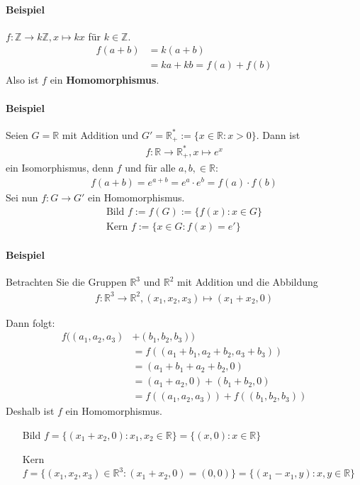 \documentclass[11pt]{report}
\newcommand*\Zb[1] {\mathbb{#1}}
\newcommand*\f[1] {\textbf{#1}}
\begin{document}
\paragraph{Beispiel} $f: \Zb{Z} \rightarrow k\Zb{Z}, x \mapsto kx$ für $k \in \Zb{Z}$.
\begin{align}
 f(a+b) &= k(a+b) \\
        &= ka + kb = f(a) + f(b)
\end{align}
Also ist $f$ ein \f{Homomorphismus}.


\paragraph{Beispiel}
Seien $G= \Zb{R}$ mit Addition und $G' = \Zb{R}^{*}_{+} := \{x \in \Zb{R}: x > 0\}$.
Dann ist 
\begin{align}
 f: \Zb{R}\rightarrow \Zb{R}_{+}^{*}, x \mapsto e^x
\end{align}
ein Isomorphismus, denn $f$ und für alle $a, b, \in \Zb{R}$:
\begin{align}
 f(a+b) = e^{a+b}= e^a\cdot e^b = f(a) \cdot f(b)
\end{align}
Sei nun $f: G \rightarrow G'$ ein Homomorphismus. 
\begin{align}
\textrm{Bild } f := f(G) := \{f(x): x \in G\} \\
\textrm{Kern } f := \{x\in G : f(x)= e'\}
\end{align}

\paragraph{Beispiel}
Betrachten Sie die Gruppen $\Zb{R}^3$ und $\Zb{R}^2$ mit Addition und die Abbildung 
\begin{align}
 f: \Zb{R}^3 \rightarrow \Zb{R}^2, (x_1, x_2, x_3) \mapsto (x_1 + x_2, 0)
\end{align}

Dann folgt:
\begin{align}
f((a_1, a_2, a_3) &+ (b_1, b_2, b_3)) \\
 &= f((a_1+b_1, a_2+b_2, a_3+b_3)) \\
 &= (a_1+b_1 + a_2+b_2, 0) \\
 &= (a_1+a_2, 0) + (b_1+b_2, 0) \\
 &= f((a_1, a_2, a_3)) + f((b_1, b_2, b_3)) 
\end{align}
Deshalb ist $f$ ein Homomorphismus.
\begin{itemize}
 \item[Bild] $f = \{(x_1+x_2, 0): x_1, x_2 \in \Zb{R}\} = \{(x, 0): x \in \Zb{R}\}$
 \item[Kern] $f = \{(x_1, x_2, x_3) \in \Zb{R}^3: (x_1 + x_2, 0) = (0,0)\} = \{(x_1 - x_1, y): x, y \in \Zb{R}\}$
\end{itemize}
\end{document}
